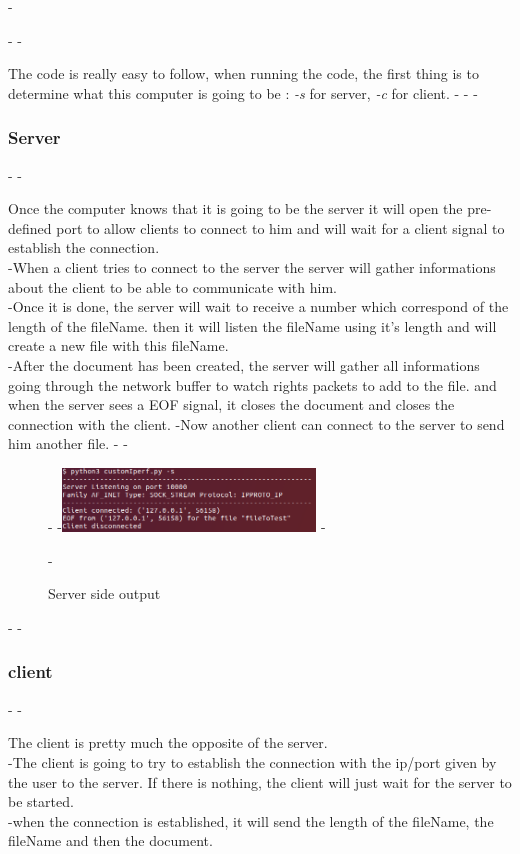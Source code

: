 -\documentclass[a4paper]{article}
\begin{document}
 -
 -\par The code is really easy to follow, when running the code, the first thing is to determine what this computer is going to be : \textit{-s} for server, \textit{-c} for client.
 -
 -
 -\subsubsection*{Server}
 -
 -\par Once the computer knows that it is going to be the server it will open the pre-defined port to allow clients to connect to him and will wait for a client signal to establish the connection.\\
 -When a client tries to connect to the server the server will gather informations about the client to be able to communicate with him.\\
 -Once it is done, the server will wait to receive a number which correspond of the length of the fileName. then it will listen the fileName using it's length and will create a new file with this fileName.\\
 -After the document has been created, the server will gather all informations going through the network buffer to watch rights packets to add to the file. and when the server sees a EOF signal, it closes the document and closes the connection with the client.
 -Now another client can connect to the server to send him another file.
 -
 -\begin{figure}
 -\centering
 -\includegraphics[width=0.6\textwidth]{serverSide.png}
 -\caption{Server side output}
 -\end{figure}
 -
 -\subsubsection*{client}
 -
 -\par The client is pretty much the opposite of the server.\\
 -The client is going to try to establish the connection with the ip/port given by the user to the server. If there is nothing, the client will just wait for the server to be started.\\
 -when the connection is established, it will send the length of the fileName, the fileName and then the document.
\end{document}
